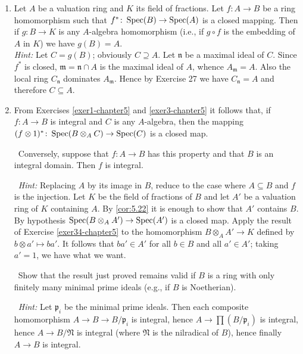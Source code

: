 \begin{enumerate}
    \quad\, Let $K$ be the field of fractions of $A$. Show that $v_0$ can be uniquely extended to a valuation $v$ of $K$, and that the value group of $v$ is precisely $\Gamma$.

    \item \label{exer34-chapter5}Let $A$ be a valuation ring and $K$ its field of fractions. Let $f \colon A \to B$ be a ring homomorphism such that $f^* \colon \operatorname{Spec}(B) \to \operatorname{Spec}(A)$ is a closed mapping. Then if $g \colon B \to K$ is any $A$-algebra homomorphism (i.e., if $g \circ f$ is the embedding of $A$ in $K$) we have $g(B) = A$.\\
    \textit{Hint:} Let $C = g(B)$; obviously $C \supseteq A$. Let $\mathfrak{n}$ be a maximal ideal of $C$. Since $f^*$ is closed, $\mathfrak{m} = \mathfrak{n} \cap A$ is the maximal ideal of $A$, whence $A_{\mathfrak{m}} = A$. Also the local ring $C_{\mathfrak{n}}$ dominates $A_{\mathfrak{m}}$. Hence by Exercise 27 we have $C_{\mathfrak{n}} = A$ and therefore $C \subseteq A$.

    \item \label{exer35-chapter5}From Exercises \ref{exer1-chapter5} and \ref{exer3-chapter5} it follows that, if $f \colon A \to B$ is integral and $C$ is any $A$-algebra, then the mapping $(f \otimes 1)^* \colon \operatorname{Spec}(B \otimes_A C) \to \operatorname{Spec}(C)$ is a closed map.
    
    \quad\, Conversely, suppose that $f \colon A \to B$ has this property and that $B$ is an integral domain. Then $f$ is integral.

    \quad\, \textit{Hint:} Replacing $A$ by its image in $B$, reduce to the case where $A \subseteq B$ and $f$ is the injection. Let $K$ be the field of fractions of $B$ and let $A'$ be a valuation ring of $K$ containing $A$. By \eqref{cor:5.22} it is enough to show that $A'$ contains $B$. By hypothesis $\operatorname{Spec}(B \otimes_A A') \to \operatorname{Spec}(A')$ is a closed map. Apply the result of Exercise \ref{exer34-chapter5} to the homomorphism $B \otimes_A A' \to K$ defined by $b \otimes a' \mapsto ba'$. It follows that $ba' \in A'$ for all $b \in B$ and all $a' \in A'$; taking $a' = 1$, we have what we want.

    \quad\, Show that the result just proved remains valid if $B$ is a ring with only finitely many minimal prime ideals (e.g., if $B$ is Noetherian).

    \quad\, \textit{Hint:} Let $\mathfrak{p}_i$ be the minimal prime ideals. Then each composite homomorphism $A \to B \to B/\mathfrak{p}_i$ is integral, hence $A \to \prod (B/\mathfrak{p}_i)$ is integral, hence $A \to B/\mathfrak{N}$ is integral (where $\mathfrak{N}$ is the nilradical of $B$), hence finally $A \to B$ is integral.
\end{enumerate}
